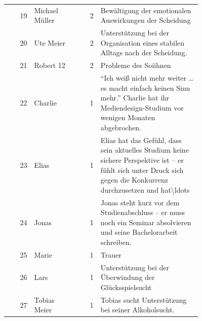 \begin{tabular}{r p{0.24\linewidth} r p{0.52\linewidth}}
19 & Michael M\"uller & 2 & Bew\"altigung der emotionalen Auswirkungen der Scheidung \\
20 & Ute Meier & 2 & Unterst\"utzung bei der Organisation eines stabilen Alltags nach der Scheidung. \\
21 & Robert 12 & 2 & Probleme des Soiihnen \\
22 & Charlie & 1 & ``Ich wei\ss{} nicht mehr weiter … es macht einfach keinen Sinn mehr.'' Charlie hat ihr Mediendesign-Studium vor wenigen Monaten abgebrochen. \\
23 & Elias & 1 & Elias hat das Gef\"uhl, dass sein aktuelles Studium keine sichere Perspektive ist -- er f\"uhlt sich unter Druck sich gegen die Konkurrenz durchzusetzen und hat\textbackslash{}ldots \\
24 & Jonas & 1 & Jonas steht kurz vor dem Studienabschluss -- er muss noch ein Seminar absolvieren und seine Bachelorarbeit schreiben. \\
25 & Marie & 1 & Trauer \\
26 & Lars & 1 & Unterst\"utzung bei der \"Uberwindung der Gl\"ucksspielsucht \\
27 & Tobias Meier & 1 & Tobias sucht Unterst\"utzung bei seiner Alkoholsucht. \\
\bottomrule
\end{tabular}
